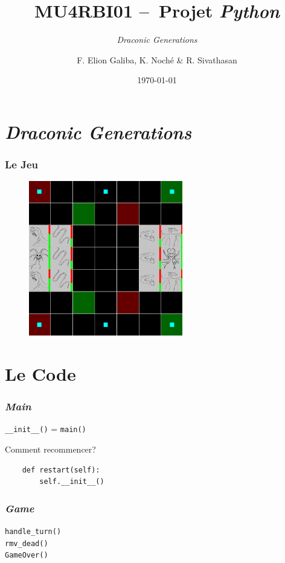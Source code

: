 \documentclass[12pt]{beamer}
\author{F. Elion Galiba, K. Noché \&{} R. Sivathasan}
\title{\textbf{MU4RBI01 --~Projet \emph{Python}}}
\subtitle{\emph{Draconic Generations}}
\institute{Sorbonne Université}
\date{\today}
\begin{document}
    \maketitle


    \section{\emph{Draconic Generations}} %
        \begin{frame} %
            \frametitle{Le Jeu}
            \begin{figure}[H]
                \centering
                \includegraphics[width=0.6\textwidth]{ImageDuJeu.png}
            \end{figure}
        \end{frame}


    \section{Le Code} %
        
        \begin{frame}[fragile]
            \frametitle{\emph{Main}}\centering
            \pause
            \texttt{\_\_init\_\_()} = \texttt{main()}
            \pause
            \begin{block}{Comment recommencer?}
                \begin{verbatim}
    def restart(self):
        self.__init__()
                \end{verbatim}
            \end{block}
        \end{frame}
        \begin{frame}
            \frametitle{\emph{Game}}\centering
            \pause
            \texttt{handle\_turn()}\\
            \pause
            \texttt{rmv\_dead()}\\
            \pause
            \texttt{GameOver()}
        \end{frame}
\end{document}
